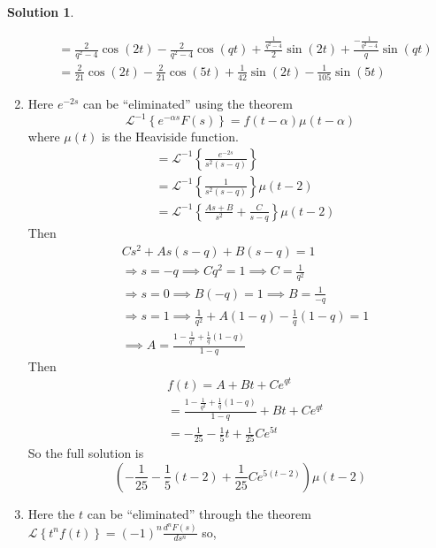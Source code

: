 \documentclass[10pt]{article}
\theoremstyle{definition}
\newtheorem{soln}{Solution}
\newcommand{\laplace}[1]{\mathcal{L}\left\{#1\right\}}
\newcommand{\laplacei}[1]{\mathcal{L}^{-1}\left\{#1\right\}}
\begin{document}
\begin{soln}
\begin{enumerate}[label=(\alph*)]
\begin{align*}
             & =\frac{2}{q^2-4}\cos\left(2t\right)-\frac{2}{q^2-4}\cos\left(qt\right)+\frac{\frac{1}{q^2-4}}{2}\sin\left(2t\right)+\frac{-\frac{1}{q^2-4}}{q}\sin\left(qt\right) \\
             & =\frac{2}{21}\cos\left(2t\right)-\frac{2}{21}\cos\left(5t\right)+\frac{1}{42}\sin\left(2t\right)-\frac{1}{105}\sin\left(5t\right)
          \end{align*}
    \item Here $e^{-2s}$ can be ``eliminated'' using the theorem $$\laplacei{e^{-\alpha s}F(s)}=f(t-\alpha)\mu(t-\alpha)$$ where $\mu(t)$ is the Heaviside function.
          \begin{align*}
             & =\laplacei{\frac{e^{-2s}}{s^2\left(s-q\right)}}    \\
             & =\laplacei{\frac{1}{s^2\left(s-q\right)}}\mu(t-2)  \\
             & =\laplacei{\frac{As+B}{s^2}+\frac{C}{s-q}}\mu(t-2)
          \end{align*}
          Then
          \begin{align*}
             & Cs^2+As\left(s-q\right)+B\left(s-q\right)=1                                            \\
             & \Rightarrow s = -q \implies Cq^2=1\implies C=\frac{1}{q^2}                             \\
             & \Rightarrow s=0 \implies B\left(-q\right)=1 \implies B=\frac{1}{-q}                    \\
             & \Rightarrow s=1 \implies \frac{1}{q^2}+A\left(1-q\right)-\frac{1}{q}\left(1-q\right)=1 \\
             & \implies A=\frac{1-\frac{1}{q^2}+\frac{1}{q}\left(1-q\right)}{1-q}
          \end{align*}
          Then
          \begin{align*}
             & f(t)=A+Bt+Ce^{qt}                                                   \\
             & =\frac{1-\frac{1}{q^2}+\frac{1}{q}\left(1-q\right)}{1-q}+Bt+Ce^{qt} \\
             & =-\frac{1}{25}-\frac{1}{5}t+\frac{1}{25}Ce^{5t}
          \end{align*}
          So the full solution is $$\left(-\frac{1}{25}-\frac{1}{5}\left(t-2\right)+\frac{1}{25}Ce^{5\left(t-2\right)}\right)\mu(t-2)$$
    \item Here the $t$ can be ``eliminated'' through the theorem $\displaystyle\laplace{t^nf(t)}=\left(-1\right)^{n}\frac{d^nF(s)}{ds^n}$ so,

\end{enumerate}
\end{soln}
\end{document}

